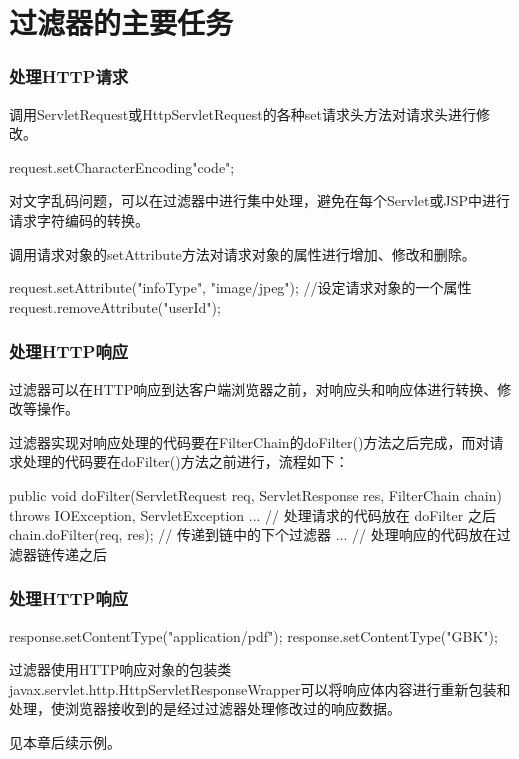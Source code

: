 \section{过滤器的主要任务}

\begin{frame}[fragile] %
\frametitle{处理HTTP请求} 


调用ServletRequest或HttpServletRequest的各种set请求头方法对请求头进行修改。

\begin{javaCode}
request.setCharacterEncoding{"code"};  
\end{javaCode}

{\kai 对文字乱码问题，可以在过滤器中进行集中处理，避免在每个Servlet或JSP中进行请求字符编码的转换。}


调用请求对象的setAttribute方法对请求对象的属性进行增加、修改和删除。

\begin{javaCode}
request.setAttribute("infoType", "image/jpeg"); //设定请求对象的一个属性
request.removeAttribute("userId");
\end{javaCode}

\end{frame}

\begin{frame}[fragile] %
\frametitle{处理HTTP响应} 

过滤器可以在HTTP响应到达客户端浏览器之前，对响应头和响应体进行转换、修改等操作。

过滤器实现对响应处理的代码要在FilterChain的doFilter()方法之后完成，而对请求处理的代码要在doFilter()方法之前进行，流程如下：

\begin{javaCode}
public void doFilter(ServletRequest req, ServletResponse res, FilterChain chain) 
    throws IOException, ServletException {
  ...  // 处理请求的代码放在 doFilter 之后
  chain.doFilter(req, res); // 传递到链中的下个过滤器
  ...  // 处理响应的代码放在过滤器链传递之后
}  
\end{javaCode}
\end{frame}

\begin{frame}[fragile] %
\frametitle{处理HTTP响应} 


\begin{javaCode}
response.setContentType("application/pdf");
response.setContentType("GBK");
\end{javaCode}


过滤器使用HTTP响应对象的包装类javax.servlet.http.HttpServletResponseWrapper可以将响应体内容进行重新包装和处理，使浏览器接收到的是经过过滤器处理修改过的响应数据。

见本章后续示例。
\end{frame}

